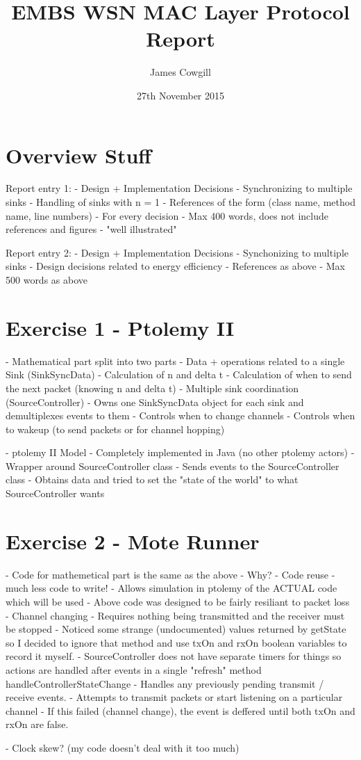 \documentclass[a4paper,12pt,draft,DIV=calc]{scrartcl}
\begin{document}
\title{EMBS WSN MAC Layer Protocol Report}
\author{James Cowgill}
\date{27th November 2015}
\maketitle

\section{Overview Stuff}
Report entry 1:
 - Design + Implementation Decisions
   - Synchronizing to multiple sinks
   - Handling of sinks with n = 1
 - References of the form (class name, method name, line numbers)
   - For every decision
 - Max 400 words, does not include references and figures
 - "well illustrated"

Report entry 2:
 - Design + Implementation Decisions
   - Synchonizing to multiple sinks
   - Design decisions related to energy efficiency
 - References as above
 - Max 500 words as above

\section{Exercise 1 - Ptolemy II}
- Mathematical part split into two parts
  - Data + operations related to a single Sink (SinkSyncData)
    - Calculation of n and delta t
    - Calculation of when to send the next packet (knowing n and delta t)
  - Multiple sink coordination (SourceController)
    - Owns one SinkSyncData object for each sink and demultiplexes events to
      them
    - Controls when to change channels
    - Controls when to wakeup (to send packets or for channel hopping)

- ptolemy II Model
  - Completely implemented in Java (no other ptolemy actors)
  - Wrapper around SourceController class
  - Sends events to the SourceController class
  - Obtains data and tried to set the "state of the world" to what
    SourceController wants

\section{Exercise 2 - Mote Runner}
- Code for mathemetical part is the same as the above
  - Why?
    - Code reuse - much less code to write!
    - Allows simulation in ptolemy of the ACTUAL code which will be used
    - Above code was designed to be fairly resiliant to packet loss
- Channel changing
  - Requires nothing being transmitted and the receiver must be stopped
    - Noticed some strange (undocumented) values returned by getState so I
      decided to ignore that method and use txOn and rxOn boolean variables to
      record it myself.
- SourceController does not have separate timers for things so actions are
  handled after events in a single "refresh" method handleControllerStateChange
  - Handles any previously pending transmit / receive events.
  - Attempts to transmit packets or start listening on a particular channel
  - If this failed (channel change), the event is deffered until both txOn
    and rxOn are false.

- Clock skew? (my code doesn't deal with it too much)
\end{document}
